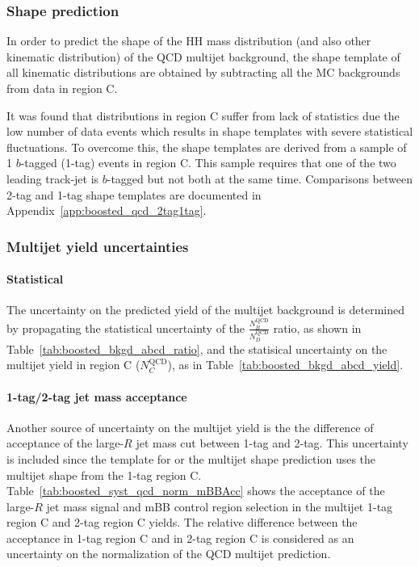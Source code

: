 \FloatBarrier
 
%
%
\subsubsection{Shape prediction}
\label{sec:boosted_bkgd_qcdmultijet_shape}
In order to predict the shape of the HH mass distribution (and also other kinematic distribution) of the QCD multijet background, the shape template of all kinematic distributions are obtained by subtracting all the MC backgrounds from data
in region C.
 
It was found that distributions in region C suffer from lack of statistics due the low number of data events which results in shape templates with severe statistical fluctuations. To overcome this, the shape templates are derived from a sample of 1 $b$-tagged (1-tag) events in region C. This sample requires that one of the two leading track-jet is $b$-tagged but not both at the same time. Comparisons between 2-tag and 1-tag shape templates are documented in Appendix~\ref{app:boosted_qcd_2tag1tag}.
 
%
%
\subsubsection{Multijet yield uncertainties}
\label{sec:boosted_bkgd_qcdmultijet_yield_unc}
 
\paragraph{Statistical} 
The uncertainty on the predicted yield of the multijet background is determined by propagating the statistical uncertainty
of the $\frac{N_B^\text{QCD}}{N_D^\text{QCD}}$ ratio, as shown in Table~\ref{tab:boosted_bkgd_abcd_ratio}, and the statisical
uncertainty on the multijet yield in region C ($N_C^\text{QCD}$), as in Table~\ref{tab:boosted_bkgd_abcd_yield}.
 
\paragraph{1-tag/2-tag jet mass acceptance} 
Another source of uncertainty on the multijet yield is the  
the difference of acceptance of the large-$R$ jet mass cut between 1-tag and 2-tag.
This uncertainty is included since the template for or the multijet shape prediction uses the multijet shape
from the 1-tag region C. Table~\ref{tab:boosted_syst_qcd_norm_mBBAcc} shows the acceptance
of the large-$R$ jet mass signal and mBB control region selection in the multijet 1-tag region C and 2-tag region C yields.
The relative difference between the acceptance in 1-tag region C and in 2-tag region C is considered as an uncertainty on the normalization
of the QCD multijet prediction.
 
